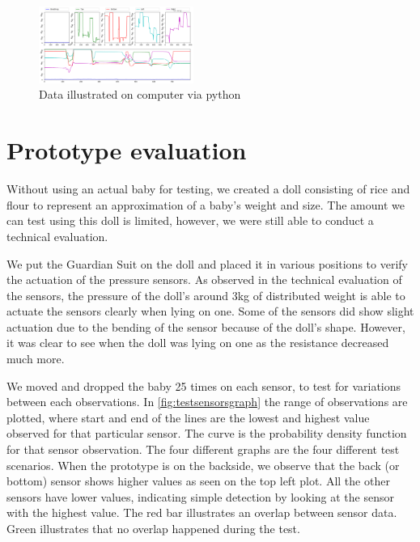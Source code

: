 \documentclass{sigchi-ext}
\begin{document}
\begin{figure}
   \centering \includegraphics[width=0.45\textwidth]{img/all_sensors}
    \caption{Data illustrated on computer via python}
    \label{fig:pyprogram}
\end{figure}

\section{Prototype evaluation}

Without using an actual baby for testing, we created a
doll consisting of rice and flour to represent an
approximation of a baby's weight and size. The amount we 
can test using this doll is limited, however, we were still able 
to conduct a technical evaluation.

We put the Guardian Suit on the doll and placed it in various
positions to verify the actuation of the pressure sensors.
As observed in the technical evaluation of the sensors,
the pressure of the doll's around 3kg of distributed weight
is able to actuate the sensors clearly when lying on one. 
Some of the sensors did show slight actuation due to the
bending of the sensor because of the doll's shape. However,
it was clear to see when the doll was lying on one as the 
resistance decreased much more.

We moved and dropped the baby 25 times on each sensor, 
to test for variations between each observations. In \autoref{fig:testsensorsgraph}
the range of observations are plotted, where start and end of the lines are the lowest and highest value observed for that particular sensor.
The curve is the probability density function for that sensor observation. The four different graphs are the four different test scenarios. 
When the prototype is on the backside, we observe that the back (or bottom) sensor shows higher values as seen on the top left plot. All the other
sensors have lower values, indicating simple detection by looking at the sensor with the highest value. The red bar illustrates an overlap between sensor data. Green illustrates that no overlap happened during the test. 
\end{document}
